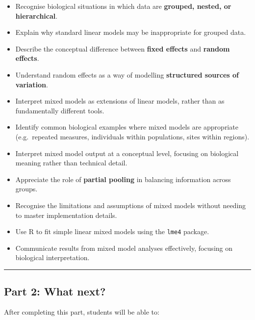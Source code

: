 \documentclass[
  letterpaper,
  8pt,
  a4paper]{book}
\providecommand{\tightlist}{%
  \setlength{\itemsep}{0pt}\setlength{\parskip}{0pt}}
\begin{document}
\begin{itemize}
\tightlist
\item
  Recognise biological situations in which data are \textbf{grouped,
  nested, or hierarchical}.
\item
  Explain why standard linear models may be inappropriate for grouped
  data.
\item
  Describe the conceptual difference between \textbf{fixed effects} and
  \textbf{random effects}.
\item
  Understand random effects as a way of modelling \textbf{structured
  sources of variation}.
\item
  Interpret mixed models as extensions of linear models, rather than as
  fundamentally different tools.
\item
  Identify common biological examples where mixed models are appropriate
  (e.g.~repeated measures, individuals within populations, sites within
  regions).
\item
  Interpret mixed model output at a conceptual level, focusing on
  biological meaning rather than technical detail.
\item
  Appreciate the role of \textbf{partial pooling} in balancing
  information across groups.
\item
  Recognise the limitations and assumptions of mixed models without
  needing to master implementation details.
\item
  Use R to fit simple linear mixed models using the \texttt{lme4}
  package.
\item
  Communicate results from mixed model analyses effectively, focusing on
  biological interpretation.
\end{itemize}

\begin{center}\rule{0.5\linewidth}{0.5pt}\end{center}

\subsection*{Part 2: What next?}\label{part-2-what-next}

After completing this part, students will be able to:
\end{document}
